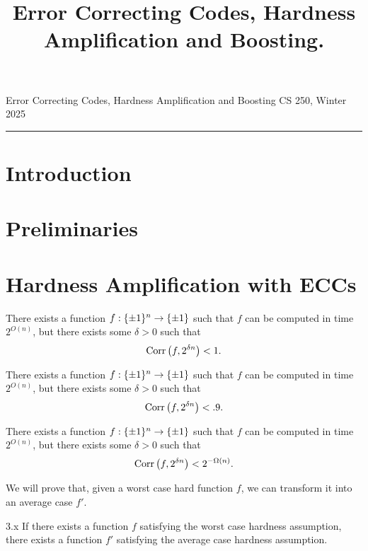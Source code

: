 \documentclass[11pt]{article}
\title{Error Correcting Codes, Hardness Amplification and Boosting.}
\date{}
\begin{document}
    
\noindent Error Correcting Codes, Hardness Amplification and Boosting \hfill  CS 250, Winter 2025\\
\hrule


\section{Introduction}

\tableofcontents


\section{Preliminaries}

\section{Hardness Amplification with ECCs}

\begin{assumption}{1} \label{a-1}
    There exists a function $f : \{\pm 1\}^n \rightarrow \{\pm 1\}$ such that $f$ can be computed in time $2^{O(n)}$, but there exists some $\delta > 0$ such that 
    \begin{equation*}
        \mathrm{Corr}\left(f, 2^{\delta n}\right) < 1.
    \end{equation*}
\end{assumption}

\begin{assumption}{2} \label{a-2}
    There exists a function $f : \{\pm 1\}^n \rightarrow \{\pm 1\}$ such that $f$ can be computed in time $2^{O(n)}$, but there exists some $\delta > 0$ such that 
    \begin{equation*}
        \mathrm{Corr}\left(f, 2^{\delta n}\right) < .9.
    \end{equation*}
\end{assumption}

\begin{assumption}{3} \label{a-3}
    There exists a function $f : \{\pm 1\}^n \rightarrow \{\pm 1\}$ such that $f$ can be computed in time $2^{O(n)}$, but there exists some $\delta > 0$ such that 
    \begin{equation*}
        \mathrm{Corr}\left(f, 2^{\delta n}\right) < 2^{-\Omega(n)}.
    \end{equation*}
\end{assumption}

We will prove that, given a worst case hard function $f$, we can transform it into an average case $f'$.

\begin{theorem}{3.x} If there exists a function $f$ satisfying the worst case hardness assumption, there exists a function $f'$ satisfying the average case hardness assumption.

\end{theorem}
\end{document}
